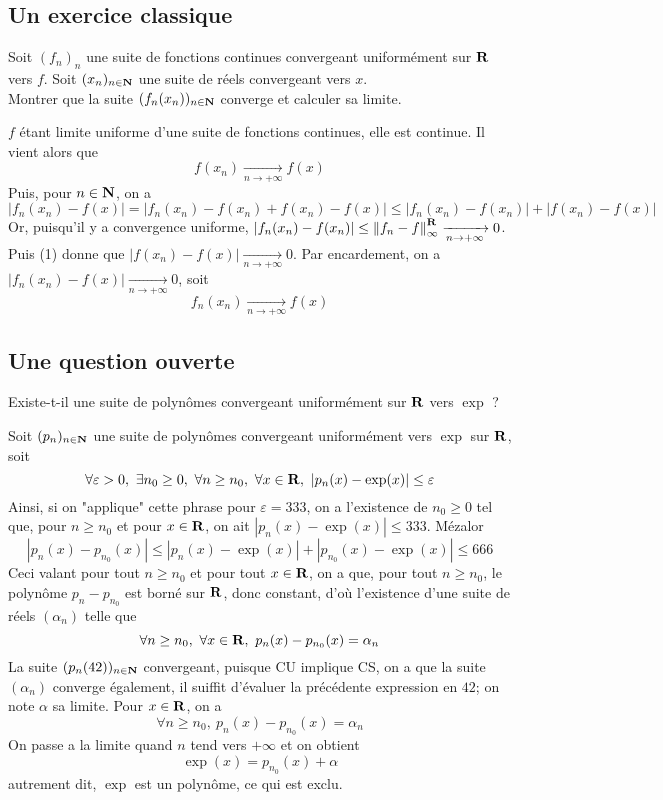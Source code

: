 \subsection{Un exercice classique}
\begin{exercice}
	Soit $(f_n)_n$ une suite de fonctions continues convergeant uniformément sur $\operatorname{\mathbf{R}}$ vers $f$. Soit $(x_n)_{n\in\operatorname{\mathbf{N}}}$ une suite de réels convergeant vers $x$.\\
	Montrer que la suite $(f_n(x_n))_{n\in\operatorname{\mathbf{N}}}$ converge et calculer sa limite.
\end{exercice}

\begin{correction}
	$f$ étant limite uniforme d'une suite de fonctions continues, elle est continue. Il vient alors que \[f(x_n)\xrightarrow[n\to+\infty]{} f(x)\tag{1}\]
	Puis, pour $n\in\operatorname{\mathbf{N}}$, on a \[|f_n(x_n)-f(x)|=|f_n(x_n)-f(x_n)+f(x_n)-f(x)|\leq|f_n(x_n)-f(x_n)|+|f(x_n)-f(x)|\]
	Or, puisqu'il y a convergence uniforme, $|f_n(x_n)-f(x_n)|\leq \left\lVert f_n-f\right\rVert_\infty^{\operatorname{\mathbf{R}}}\xrightarrow[n\to+\infty]{} 0$. Puis (1) donne que $|f(x_n)-f(x)|\xrightarrow[n\to+\infty]{}0$. Par encardement, on a $|f_n(x_n)-f(x)|\xrightarrow[n\to+\infty]{} 0$, soit \[\boxed{f_n(x_n)\xrightarrow[n\to+\infty]{}f(x)}\]
\end{correction}

\subsection{Une question ouverte}
\begin{exercice}
	Existe-t-il une suite de polynômes convergeant uniformément sur $\operatorname{\mathbf{R}}$ vers $\exp$ ?
\end{exercice}

\begin{correction}
	Soit $(p_n)_{n\in\operatorname{\mathbf{N}}}$ une suite de polynômes convergeant uniformément vers $\exp$ sur $\operatorname{\mathbf{R}}$, soit \[\forall \varepsilon > 0,\ \exists n_0\geq 0,\ \forall n\geq n_0,\ \forall x\in\R,\ |p_n(x)-\exp(x)|\leq \varepsilon\]
	Ainsi, si on "applique" cette phrase pour $\varepsilon = 333$, on a l'existence de $n_0\geq 0$ tel que, pour $n\geq n_0$ et pour $x\in\operatorname{\mathbf{R}}$, on ait $|p_n(x)-\exp(x)|\leq 333$. Mézalor \[|p_n(x)-p_{n_0}(x)|\leq |p_n(x)-\exp(x)|+|p_{n_0}(x)-\exp(x)|\leq 666\]
	Ceci valant pour tout $n\geq n_0$ et pour tout $x\in\operatorname{\mathbf{R}}$, on a que, pour tout $n\geq n_0$, le polynôme $p_n-p_{n_0}$ est borné sur $\operatorname{\mathbf{R}}$, donc constant, d'où l'existence d'une suite de réels $(\alpha_n)$ telle que \[\forall n\geq n_0,\ \forall x\in\operatorname{\mathbf{R}},\ p_n(x)-p_{n_0}(x)=\alpha_n\]
	La suite $(p_n(42))_{n\in\operatorname{\mathbf{N}}}$ convergeant, puisque CU implique CS, on a que la suite $(\alpha_n)$ converge également, il suiffit d'évaluer la précédente expression en $42$; on note $\alpha$ sa limite. Pour $x\in\operatorname{\mathbf{R}}$, on a \[\forall n\geq n_0,\ p_n(x)-p_{n_0}(x)=\alpha_n\]
	On passe a la limite quand $n$ tend vers $+\infty$ et on obtient \[\exp(x)=p_{n_0}(x)+\alpha\]
	autrement dit, $\exp$ est un polynôme, ce qui est exclu.
\end{correction}

